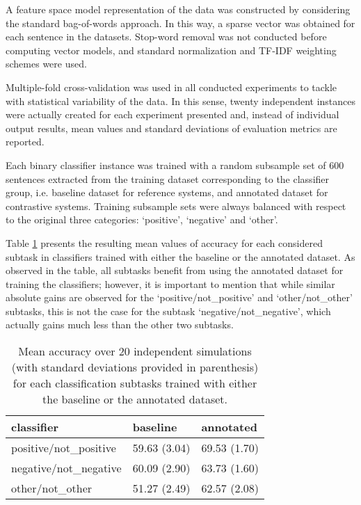 \documentclass[11pt]{elsarticle}
\begin{document}
A feature space model representation of the data was constructed by considering the standard bag-of-words approach.
In this way, a sparse vector was obtained for each sentence in the datasets. Stop-word removal was not
conducted before computing vector models, and standard normalization and TF-IDF weighting schemes were used.

Multiple-fold cross-validation was used in all conducted experiments to tackle with statistical variability of the
data. In this sense, twenty independent instances were actually created for each experiment presented and,
instead of individual output results, mean values and standard deviations of evaluation metrics are reported.

Each binary classifier instance was trained with a random subsample set of 600 sentences extracted from
the training dataset corresponding to the classifier group, i.e. baseline dataset for reference systems,
and annotated dataset for contrastive systems. Training subsample sets were always balanced with respect to
the original three categories: `positive', `negative' and `other'.


Table \ref{table:tc_accu} presents the resulting mean values of accuracy for each considered subtask
in classifiers trained with either the baseline or the annotated dataset. As observed in the table,
all subtasks benefit from using the annotated dataset for training the classifiers; however, it is
important to mention that while similar absolute gains are observed for the `positive/not\_positive'
and `other/not\_other' subtasks, this is not the case for the subtask `negative/not\_negative',
which actually gains much less than the other two subtasks.

\begin{table}
\begin{center}
\begin{small}
\begin{tabular}{|l|l|l|}
\hline
classifier &baseline &annotated \\
\hline
positive/not\_positive &59.63 (3.04) &69.53 (1.70) \\
\hline
negative/not\_negative &60.09 (2.90) &63.73 (1.60) \\
\hline
other/not\_other &51.27 (2.49) &62.57 (2.08) \\
\hline
\end{tabular}
\end{small}
\caption{Mean accuracy over 20 independent simulations (with standard deviations provided in parenthesis)
for each classification subtasks trained with either the baseline or the annotated dataset.}
\label{table:tc_accu}
\end{center}
\end{table}
\end{document}
